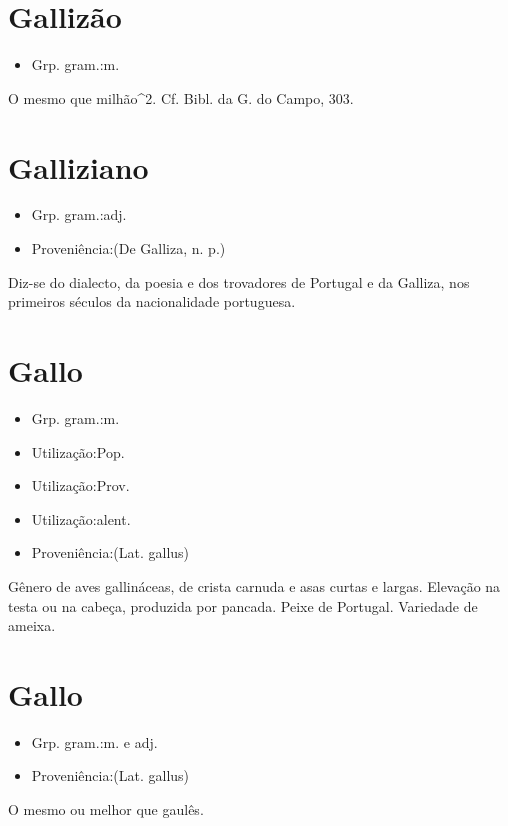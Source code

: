 \section{Gallizão}
\begin{itemize}
\item {Grp. gram.:m.}
\end{itemize}
O mesmo que \textunderscore milhão\textunderscore ^2. Cf. \textunderscore Bibl. da G. do Campo\textunderscore , 303.
\section{Galliziano}
\begin{itemize}
\item {Grp. gram.:adj.}
\end{itemize}
\begin{itemize}
\item {Proveniência:(De \textunderscore Galliza\textunderscore , n. p.)}
\end{itemize}
Diz-se do dialecto, da poesia e dos trovadores de Portugal e da Galliza, nos primeiros séculos da nacionalidade portuguesa.
\section{Gallo}
\begin{itemize}
\item {Grp. gram.:m.}
\end{itemize}
\begin{itemize}
\item {Utilização:Pop.}
\end{itemize}
\begin{itemize}
\item {Utilização:Prov.}
\end{itemize}
\begin{itemize}
\item {Utilização:alent.}
\end{itemize}
\begin{itemize}
\item {Proveniência:(Lat. \textunderscore gallus\textunderscore )}
\end{itemize}
Gênero de aves gallináceas, de crista carnuda e asas curtas e largas.
Elevação na testa ou na cabeça, produzida por pancada.
Peixe de Portugal.
Variedade de ameixa.
\section{Gallo}
\begin{itemize}
\item {Grp. gram.:m.  e  adj.}
\end{itemize}
\begin{itemize}
\item {Proveniência:(Lat. \textunderscore gallus\textunderscore )}
\end{itemize}
O mesmo ou melhor que \textunderscore gaulês\textunderscore .

